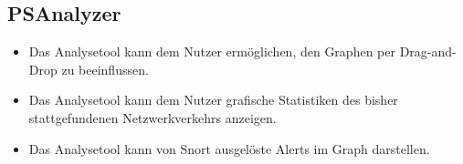 \subsection{PSAnalyzer}
\begin{itemize}
  \item Das Analysetool kann dem Nutzer ermöglichen, den Graphen per Drag-and-Drop zu beeinflussen. 
  \item Das Analysetool kann dem Nutzer grafische Statistiken des bisher stattgefundenen Netzwerkverkehrs anzeigen. 
  \item Das Analysetool kann von Snort ausgelöste Alerts im Graph darstellen. 
\end{itemize}